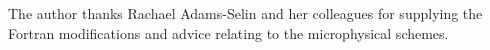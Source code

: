 \documentclass{ametsoc}
\begin{document}
\begin{acknowledgment} 
The author thanks Rachael Adams-Selin and her colleagues for supplying the Fortran modifications and advice relating to the microphysical schemes.
\end{acknowledgment}






\end{document}
